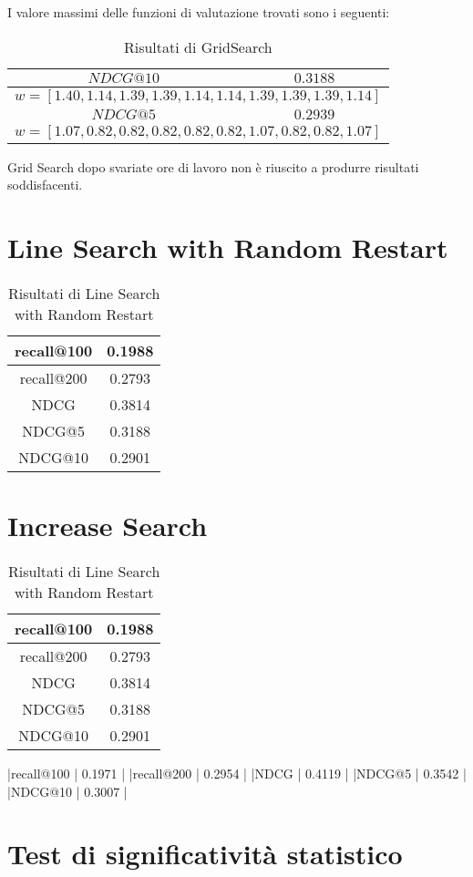 I valore massimi delle funzioni di valutazione trovati
sono i seguenti:

\begin{table}[h!]
	\centering
	\begin{tabular}{|c|c|}
		\hline
		$NDCG@10$ & $ 0.3188 $ \\
		\hline
		      \multicolumn{2}{|l|}{$w=[1.40, 1.14, 1.39, 1.39, 1.14, 1.14, 1.39, 1.39, 1.39, 1.14]$} \tabularnewline
		\hline
				$NDCG@5$ & $ 0.2939 $ \\
		\hline
		\multicolumn{2}{|l|}{$w=[1.07, 0.82, 0.82, 0.82, 0.82, 0.82, 1.07, 0.82, 0.82, 1.07]$} \tabularnewline
		\hline
	\end{tabular}
	\caption{Risultati di GridSearch}
\end{table}

Grid Search dopo svariate ore di lavoro non è riuscito a produrre risultati soddisfacenti.


\section{Line Search with Random Restart}

\begin{table}[h!]
	\centering
	\begin{tabular}{|c|c|}
		\hline
		recall@100 &  0.1988 \\
		\hline
		recall@200 & 0.2793  \\
		\hline
		NDCG & 0.3814 \\
		\hline
		NDCG@5 & 0.3188 \\
		\hline
		NDCG@10 & 0.2901 \\
		\hline
	\end{tabular}
	\caption{Risultati di Line Search with Random Restart}
\end{table}


\section{Increase Search}

\begin{table}[h!]
	\centering
	\begin{tabular}{|c|c|}
		\hline
		recall@100 &  0.1988 \\
		\hline
		recall@200 & 0.2793  \\
		\hline
		NDCG & 0.3814 \\
		\hline
		NDCG@5 & 0.3188 \\
		\hline
		NDCG@10 & 0.2901 \\
		\hline
	\end{tabular}
	\caption{Risultati di Line Search with Random Restart}
\end{table}

|recall@100   | 0.1971 |
|recall@200   | 0.2954 |
|NDCG         | 0.4119 |
|NDCG@5       | 0.3542 |
|NDCG@10      | 0.3007 |


\section{Test di significatività statistico}